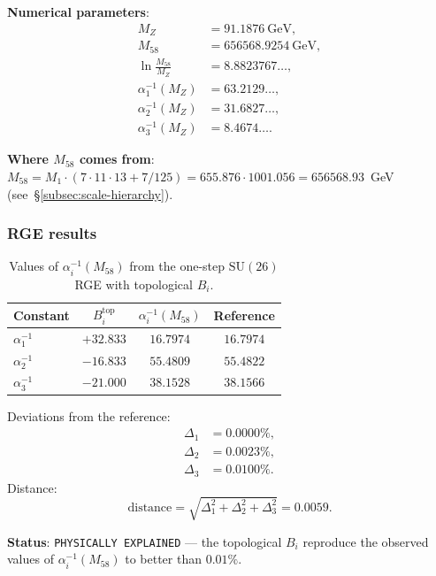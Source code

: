 \documentclass[11pt,a4paper]{article}
\newcommand{\SU}{\ensuremath{\mathrm{SU}}}
\theoremstyle{definition}
\begin{document}
\medskip\noindent
\textbf{Numerical parameters}:
\begin{align}
    M_Z &= 91.1876~\text{GeV}, \\
    M_{58} &= 656568.9254~\text{GeV}, \\
    \ln\frac{M_{58}}{M_Z} &= 8.8823767\ldots, \\
    \alpha_1^{-1}(M_Z) &= 63.2129\ldots, \\
    \alpha_2^{-1}(M_Z) &= 31.6827\ldots, \\
    \alpha_3^{-1}(M_Z) &= 8.4674\ldots.
\end{align}

\medskip\noindent
\textbf{Where $M_{58}$ comes from}: $M_{58} = M_1 \cdot (7 \cdot 11 \cdot 13
+ 7/125) = 655.876 \cdot 1001.056 = 656568.93$~GeV
(see~\S\ref{subsec:scale-hierarchy}).

\subsubsection{RGE results}

\begin{table}[ht]
\centering
\caption{Values of \texorpdfstring{$\alpha_i^{-1}(M_{58})$}{\_i^-1(M\_58)} from the one-step
\texorpdfstring{$\SU(26)$}{(26)} RGE with topological \texorpdfstring{$B_i$}{B\_i}.}
\label{tab:alpha-values-bi}
\begin{tabular}{lccc}
\toprule
Constant & $B_i^{\text{top}}$ & $\alpha_i^{-1}(M_{58})$ & Reference \\
\midrule
$\alpha_1^{-1}$ & $+32.833$ & $16.7974$ & $16.7974$ \\
$\alpha_2^{-1}$ & $-16.833$ & $55.4809$ & $55.4822$ \\
$\alpha_3^{-1}$ & $-21.000$ & $38.1528$ & $38.1566$ \\
\bottomrule
\end{tabular}
\end{table}

\medskip\noindent
Deviations from the reference:
\begin{align}
    \Delta_1 &= 0.0000\%, \\
    \Delta_2 &= 0.0023\%, \\
    \Delta_3 &= 0.0100\%.
\end{align}
Distance:
\begin{equation}
    \text{distance} = \sqrt{\Delta_1^2 + \Delta_2^2 + \Delta_3^2}
    = 0.0059.
\end{equation}

\medskip\noindent
\textbf{Status}: \texttt{PHYSICALLY EXPLAINED} --- the topological
$B_i$ reproduce the observed values of $\alpha_i^{-1}(M_{58})$
to better than $0.01\%$.
\end{document}
